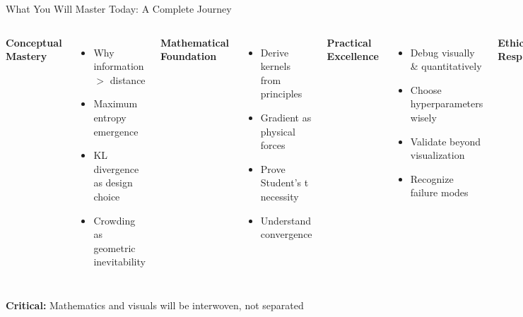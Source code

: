 \documentclass[aspectratio=169]{beamer}
\begin{document}
\begin{frame}{What You Will Master Today: A Complete Journey}
\begin{columns}
\textbf{Conceptual Mastery}
\begin{itemize}
\item Why information $>$ distance
\item Maximum entropy emergence
\item KL divergence as design choice
\item Crowding as geometric inevitability
\end{itemize}

\textbf{Mathematical Foundation}
\begin{itemize}
\item Derive kernels from principles
\item Gradient as physical forces
\item Prove Student's t necessity
\item Understand convergence
\end{itemize}

\textbf{Practical Excellence}
\begin{itemize}
\item Debug visually \& quantitatively
\item Choose hyperparameters wisely
\item Validate beyond visualization
\item Recognize failure modes
\end{itemize}

\textbf{Ethical Responsibility}
\begin{itemize}
\item Avoid false pattern creation
\item Communicate limitations
\item Document completely
\item Interpret responsibly
\end{itemize}
\end{columns}

\vspace{0.2cm}
\colorbox{yellow!30}{\textbf{Critical:} Mathematics and visuals will be interwoven, not separated}
\end{frame}
\end{document}
